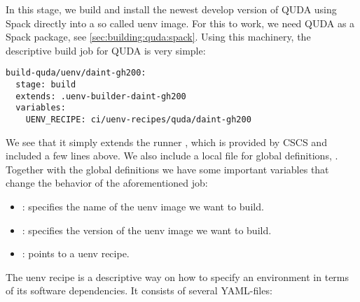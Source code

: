 In this stage, we build and install the newest develop version of QUDA using Spack\cite{Gamblin_The_Spack_Package_2015} directly into a so called uenv\cite{online:cscs:uenv} image. For this to work, we need QUDA as a Spack package, see \cref{sec:building:quda:spack}. Using this machinery, the descriptive build job for QUDA is very simple:
\begin{verbatim}
build-quda/uenv/daint-gh200:
  stage: build
  extends: .uenv-builder-daint-gh200
  variables:
    UENV_RECIPE: ci/uenv-recipes/quda/daint-gh200
\end{verbatim}
We see that it simply extends the runner , which is provided by CSCS and included a few lines above. We also include a local file for global definitions, . Together with the global definitions we have some important variables that change the behavior of the aforementioned job:
\begin{itemize}
  \item {}: specifies the name of the uenv image we want to build.
  \item {}: specifies the version of the uenv image we want to build.
  \item {}: points to a uenv recipe.
\end{itemize}
The uenv recipe is a descriptive way on how to specify an environment in terms of its software dependencies. It consists of several YAML-files:
